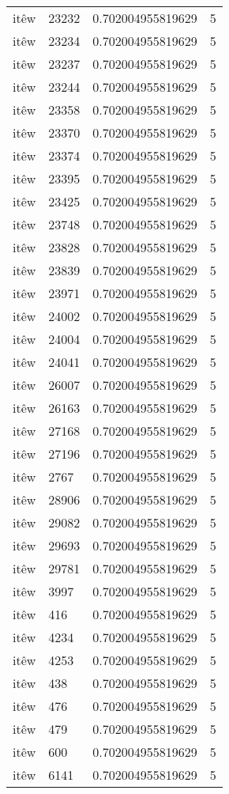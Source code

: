 \begin{longtable}{llll}
itêw & 23232 & 0.702004955819629 & 5\\
itêw & 23234 & 0.702004955819629 & 5\\
itêw & 23237 & 0.702004955819629 & 5\\
itêw & 23244 & 0.702004955819629 & 5\\
itêw & 23358 & 0.702004955819629 & 5\\
itêw & 23370 & 0.702004955819629 & 5\\
itêw & 23374 & 0.702004955819629 & 5\\
itêw & 23395 & 0.702004955819629 & 5\\
itêw & 23425 & 0.702004955819629 & 5\\
itêw & 23748 & 0.702004955819629 & 5\\
itêw & 23828 & 0.702004955819629 & 5\\
itêw & 23839 & 0.702004955819629 & 5\\
itêw & 23971 & 0.702004955819629 & 5\\
itêw & 24002 & 0.702004955819629 & 5\\
itêw & 24004 & 0.702004955819629 & 5\\
itêw & 24041 & 0.702004955819629 & 5\\
itêw & 26007 & 0.702004955819629 & 5\\
itêw & 26163 & 0.702004955819629 & 5\\
itêw & 27168 & 0.702004955819629 & 5\\
itêw & 27196 & 0.702004955819629 & 5\\
itêw & 2767 & 0.702004955819629 & 5\\
itêw & 28906 & 0.702004955819629 & 5\\
itêw & 29082 & 0.702004955819629 & 5\\
itêw & 29693 & 0.702004955819629 & 5\\
itêw & 29781 & 0.702004955819629 & 5\\
itêw & 3997 & 0.702004955819629 & 5\\
itêw & 416 & 0.702004955819629 & 5\\
itêw & 4234 & 0.702004955819629 & 5\\
itêw & 4253 & 0.702004955819629 & 5\\
itêw & 438 & 0.702004955819629 & 5\\
itêw & 476 & 0.702004955819629 & 5\\
itêw & 479 & 0.702004955819629 & 5\\
itêw & 600 & 0.702004955819629 & 5\\
itêw & 6141 & 0.702004955819629 & 5\\

\end{longtable}

